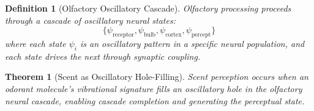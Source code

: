 \documentclass[12pt,a4paper]{article}
\newtheorem{theorem}{Theorem}
\newtheorem{definition}{Definition}
\begin{document}
\begin{definition}[Olfactory Oscillatory Cascade]
\label{def:olfactory_cascade}
Olfactory processing proceeds through a cascade of oscillatory neural states:
\begin{equation}
\{\psi_{\text{receptor}}, \psi_{\text{bulb}}, \psi_{\text{cortex}}, \psi_{\text{percept}}\}
\end{equation}
where each state $\psi_i$ is an oscillatory pattern in a specific neural population, and each state drives the next through synaptic coupling.
\end{definition}

\begin{theorem}[Scent as Oscillatory Hole-Filling]
\label{thm:scent_hole_filling}
Scent perception occurs when an odorant molecule's vibrational signature fills an oscillatory hole in the olfactory neural cascade, enabling cascade completion and generating the perceptual state.
\end{theorem}
\end{document}
